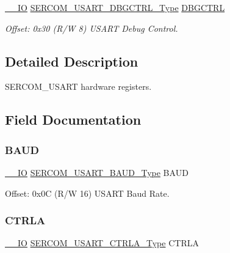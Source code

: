 \begin{DoxyCompactItemize}
\item 
\mbox{\hyperlink{core__cm0plus_8h_aec43007d9998a0a0e01faede4133d6be}{\+\_\+\+\_\+\+IO}} \mbox{\hyperlink{union_s_e_r_c_o_m___u_s_a_r_t___d_b_g_c_t_r_l___type}{S\+E\+R\+C\+O\+M\+\_\+\+U\+S\+A\+R\+T\+\_\+\+D\+B\+G\+C\+T\+R\+L\+\_\+\+Type}} \mbox{\hyperlink{struct_sercom_usart_a60189a8ca1ac6368c42c4e668963fcb0}{D\+B\+G\+C\+T\+RL}}
\begin{DoxyCompactList}\small\item\em Offset\+: 0x30 (R/W 8) U\+S\+A\+RT Debug Control. \end{DoxyCompactList}\end{DoxyCompactItemize}


\subsection{Detailed Description}
S\+E\+R\+C\+O\+M\+\_\+\+U\+S\+A\+RT hardware registers. 

\subsection{Field Documentation}
\mbox{\label{struct_sercom_usart_ab773f38cda319609cc8686f57f8f1f46}} 
\subsubsection{\texorpdfstring{BAUD}{BAUD}}
{\footnotesize\ttfamily \mbox{\hyperlink{core__cm0plus_8h_aec43007d9998a0a0e01faede4133d6be}{\+\_\+\+\_\+\+IO}} \mbox{\hyperlink{union_s_e_r_c_o_m___u_s_a_r_t___b_a_u_d___type}{S\+E\+R\+C\+O\+M\+\_\+\+U\+S\+A\+R\+T\+\_\+\+B\+A\+U\+D\+\_\+\+Type}} B\+A\+UD}



Offset\+: 0x0C (R/W 16) U\+S\+A\+RT Baud Rate. 

\mbox{\label{struct_sercom_usart_a6393331bbcb92d09cbebe604ae44233a}} 
\subsubsection{\texorpdfstring{CTRLA}{CTRLA}}
{\footnotesize\ttfamily \mbox{\hyperlink{core__cm0plus_8h_aec43007d9998a0a0e01faede4133d6be}{\+\_\+\+\_\+\+IO}} \mbox{\hyperlink{union_s_e_r_c_o_m___u_s_a_r_t___c_t_r_l_a___type}{S\+E\+R\+C\+O\+M\+\_\+\+U\+S\+A\+R\+T\+\_\+\+C\+T\+R\+L\+A\+\_\+\+Type}} C\+T\+R\+LA}



